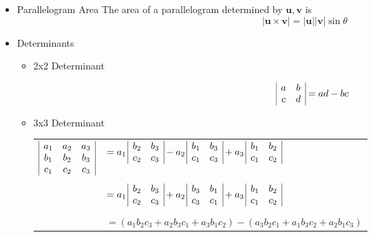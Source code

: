 \documentclass[12pt]{article}
\renewcommand{\vec}[1]{\mathbf{#1}}
\newcommand{\<}{\left<}
\renewcommand{\>}{\right>}
\begin{document}
\begin{itemize}
    \item Parallelogram Area
      The area of a parallelogram determined by $\vec{u},\vec{v}$ is \[|\vec{u} \times \vec{v}| = |\vec{u}||\vec{v}|\sin \theta\]
    
    \newpage
    \item Determinants
      \begin{itemize}
      \item 2x2 Determinant
      
      \[
\begin{array}{|c c|}
a & b \\
c & d \\
\end{array}
      = ad - bc
      \]
      
      \item 3x3 Determinant

\begin{center}\begin{tabular}{rl}
  $
    \begin{array}{|c c c|}
    a_1 & a_2 & a_3 \\
    b_1 & b_2 & b_3 \\
    c_1 & c_2 & c_3 \\
    \end{array}
  $
  &
  $
      = a_1 \,
    \begin{array}{|c c|}
    b_2 & b_3 \\
    c_2 & c_3 \\
    \end{array}
      - a_2 \,
    \begin{array}{|c c|}
    b_1 & b_3 \\
    c_1 & c_3 \\
    \end{array}
      + a_3 \,
    \begin{array}{|c c|}
    b_1 & b_2 \\
    c_1 & c_2 \\
    \end{array}
  $
  \\ [1ex] \\ &
  $
     = a_1 \,
    \begin{array}{|c c|}
    b_2 & b_3 \\
    c_2 & c_3 \\
    \end{array}
      + a_2 \,
    \begin{array}{|c c|}
    b_3 & b_1 \\
    c_3 & c_1 \\
    \end{array}
      + a_3 \,
    \begin{array}{|c c|}
    b_1 & b_2 \\
    c_1 & c_2 \\
    \end{array}
  $
  \\ [1ex] \\ &
  $= (a_1b_2c_3 + a_2b_3c_1 + a_3b_1c_2) - (a_3b_2c_1 + a_1b_3c_2 + a_2b_1c_3)$
\end{tabular}\end{center}
      

\end{itemize}
\end{itemize}
\end{document}
